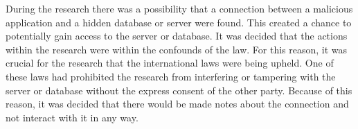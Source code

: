 During the research there was a possibility that a connection between a malicious application and a hidden database or server were found. This created a chance to potentially gain access to the server or database. It was decided that the actions within the research were within the confounds of the law. For this reason, it was crucial for the research that the international laws were being upheld. One of these laws had prohibited the research from interfering or tampering with the server or database without the express consent of the other party. Because of this reason, it was decided that there would be made notes about the connection and not interact with it in any way.